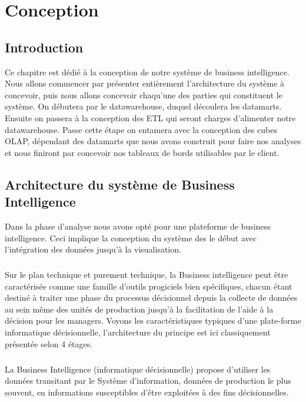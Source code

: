 \chapter{Conception}

\section*{Introduction}%
%
Ce chapitre est dédié à la conception de notre système de business intelligence. Nous allons commencer par présenter entièrement l’architecture du système à concevoir, puis nous allons concevoir chaqu’une des parties qui constituent le système. On débutera par le datawarehouse, duquel découlera les datamarts. Ensuite on passera à la conception des ETL qui seront charges d’alimenter notre datawarehouse. Passe cette étape on entamera avec la conception des cubes OLAP, dépendant des datamarts que nous avons construit pour faire nos analyses et nous finiront par concevoir nos tableaux de bords utilisables par le client. 

\section{Architecture du système de Business Intelligence}
Dans la phase d’analyse nous avons opté pour une plateforme de business intelligence. Ceci implique la conception du système des le début avec l’intégration des données jusqu’à la visualisation. 
\paragraph{}
Sur le plan technique et purement technique, la Business intelligence peut être caractérisée comme une famille d'outils progiciels bien spécifiques, chacun étant destiné à traiter une phase du processus décisionnel depuis la collecte de données au sein même des unités de production jusqu'à la facilitation de l'aide à la décision pour les managers. Voyons les caractéristiques typiques d'une plate-forme informatique décisionnelle, l'architecture du principe est ici classiquement présentée selon 4 étages.
\paragraph{}
La Business Intelligence (informatique décisionnelle) propose d'utiliser les données transitant par le Système d'information, données de production le plus souvent, en informations susceptibles d'être exploitées à des fins décisionnelles.

